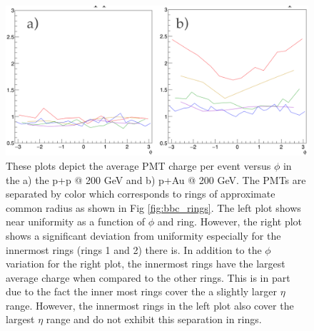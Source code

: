 \begin{figure}[h!]
\begin{center}
\includegraphics[width=0.75\linewidth]{figs/pp_pau_bbc_comparison.png}
\caption{These plots depict the average PMT charge per event versus $\phi$ in the a) the p+p @ 200 GeV and b) p+Au @ 200 GeV. The PMTs are separated by color which corresponds to rings of approximate common radius as shown in Fig \ref{fig:bbc_rings}. The left plot shows near uniformity as a function of $\phi$ and ring. However, the right plot shows a significant deviation from uniformity especially for the innermost rings (rings 1 and 2) there is. In addition to the $\phi$ variation for the right plot, the innermost rings have the largest average charge when compared to the other rings. This is in part due to the fact the inner most rings cover the a slightly larger $\eta$ range. However, the innermost rings in the left plot also cover the largest $\eta$ range and do not exhibit this separation in rings. }
\label{fig:bbc_pmt_phi_pp_pau}
\end{center}
\end{figure}

